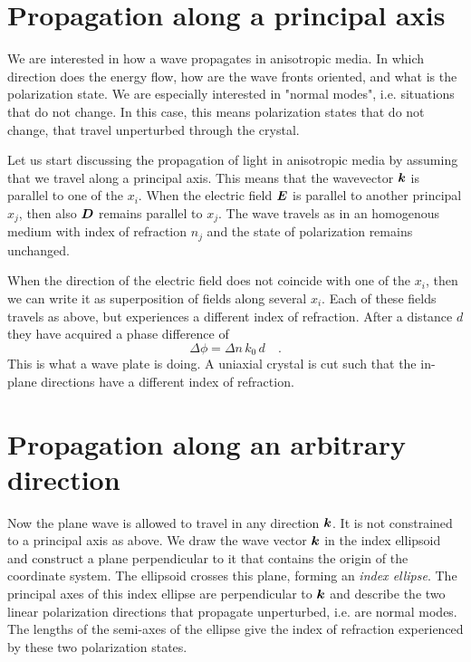 \section{Propagation along a principal axis}

We are interested in how a wave propagates in anisotropic media. In which direction does the energy flow, how are the wave fronts oriented, and what is the polarization state. We are especially interested in "normal modes", i.e. situations that do not change. In this case, this means polarization states that do not change, that travel unperturbed through the crystal.

Let us start discussing the propagation of light in anisotropic media by assuming that we travel along a principal axis. This means that the wavevector $\boldsymbol{k}$ is parallel to one of the $x_i$. When the electric field $\boldsymbol{E}$ is parallel to another principal $x_j$, then also $\boldsymbol{D}$ remains parallel to $x_j$. The wave travels as in an homogenous medium with index of refraction $n_j$ and the state of polarization remains unchanged.

When the direction of the electric field does not coincide with one of the $x_i$, then we can write it as superposition of fields along several $x_i$. Each of these fields travels as above, but  experiences a different index of refraction. After a distance $d$ they  have acquired a phase difference of 
\begin{equation}
    \Delta \phi = \Delta n \, k_0 \, d \quad .
\end{equation}
This is what a wave plate is doing. A uniaxial crystal is cut such that the in-plane directions have a different index of refraction.


\section{Propagation along an arbitrary direction}

Now the plane wave is allowed to travel in any direction $\boldsymbol{k}$. It is not constrained to a principal axis as above. We draw the wave vector $\boldsymbol{k}$ in the index ellipsoid and construct a plane perpendicular to it that contains the origin of the coordinate system. The ellipsoid crosses this plane, forming an \emph{index ellipse}. The principal axes of this index ellipse are perpendicular to $\boldsymbol{k}$ and describe the two linear polarization directions that propagate unperturbed, i.e. are normal modes. The lengths of the semi-axes of the ellipse give the index of refraction experienced by these two polarization states.


